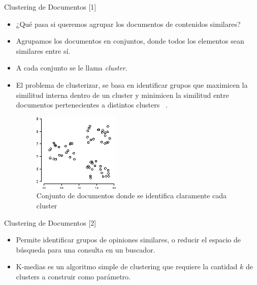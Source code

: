 \documentclass[mathserif]{beamer}
\begin{document}
\begin{frame}{Clustering de Documentos [1]}
\footnotesize{
\begin{itemize}
 \item ¿Qué pasa si queremos agrupar los documentos de contenidos similares?
 \item Agrupamos los documentos en conjuntos, donde todos los elementos sean similares entre sí. 
 \item A cada conjunto se le llama  \emph{cluster}. 
 \item El problema de clusterizar, se basa en identificar grupos que maximicen la similitud interna dentro de un cluster y minimicen la similitud entre documentos  pertenecientes a distintos clusters ~\cite{adaptivewebsites}.
\begin{figure}[h!]
	\centering
	\includegraphics[scale=0.6]{pics/cluster.png}
	\caption{ Conjunto de documentos donde se identifica claramente cada cluster}
\end{figure}
 
\end{itemize}


}
 
\end{frame}

\begin{frame}{Clustering de Documentos [2]}
\footnotesize{
\begin{itemize}
 \item Permite identificar grupos de opiniones similares, o reducir el espacio de búsqueda para una consulta en un buscador. 
 \item K-medias es un algoritmo simple de clustering que requiere la cantidad $k$ de clusters a construir como parámetro.

\end{itemize}
}
\end{frame}
\end{document}
